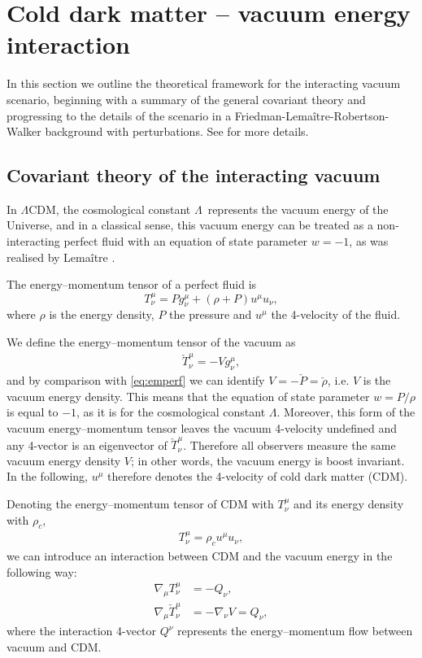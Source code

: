 \documentclass[a4paper,fleqn,usenatbib]{mnras}
\newcommand*{\LCDM}{$\Lambda$CDM}
\newcommand*{\La}{$\Lambda$}
\begin{document}
\section{Cold dark matter -- vacuum energy interaction} \label{sec:theory}
In this section we outline the theoretical framework for the interacting vacuum scenario, beginning with a summary of the general covariant theory and progressing to the details of the scenario in a Friedman-Lema\^{i}tre-Robertson-Walker background with perturbations. See \cite{Wands:2012vg} for more details.

\subsection{Covariant theory of the interacting vacuum}
In \LCDM, the cosmological constant \La \ represents the vacuum energy of the Universe, and in a classical sense, this vacuum energy can be treated as a non-interacting perfect fluid with an equation of state parameter $w=-1$, as was realised by Lema\^{i}tre \citep{1931Natur.127..706L,Lemaitre1933}.

The energy--momentum tensor of a perfect fluid is
\begin{equation}
T^\mu_\nu = P g^\mu_\nu + (\rho + P) u^\mu u_\nu, \label{eq:emperf}
\end{equation}
where $\rho$ is the energy density, $P$ the pressure and $u^\mu$ the 4-velocity of the fluid.

We define the energy--momentum tensor of the vacuum as
\begin{align}
\check{T}^\mu_\nu = -V g^\mu_\nu,
\end{align}
and by comparison with \eqref{eq:emperf} we can identify $V = -\check{P} = \check{\rho}$, i.e. $V$ is the vacuum energy density. This means that the equation of state parameter $w = P/\rho$  is equal to $-1$, as it is for the cosmological constant \La. Moreover, this form of the vacuum energy--momentum tensor leaves the vacuum 4-velocity undefined and any 4-vector is an eigenvector of $\check{T}^\mu_\nu$. Therefore all observers measure the same vacuum energy density $V$; in other words, the vacuum energy is boost invariant. In the following, $u^\mu$ therefore denotes the 4-velocity of cold dark matter (CDM).

Denoting the energy--momentum tensor of CDM with $T^\mu_\nu$ and its energy density with $\rho_c$,
\begin{align}
 T^\mu_\nu = \rho_c u^\mu u_\nu,
\end{align}
we can introduce an interaction between CDM and the vacuum energy in the following way:
\begin{align}
\nabla_\mu T^\mu_\nu &= -Q_\nu \label{eq:gencdmcons}, \\
\nabla_\mu \check{T}^\mu_\nu &= -\nabla_\nu V = Q_\nu, \label{eq:genvaccons}
\end{align}
where the interaction 4-vector $Q^\nu$ represents the energy--momentum flow between vacuum and CDM.
\end{document}
